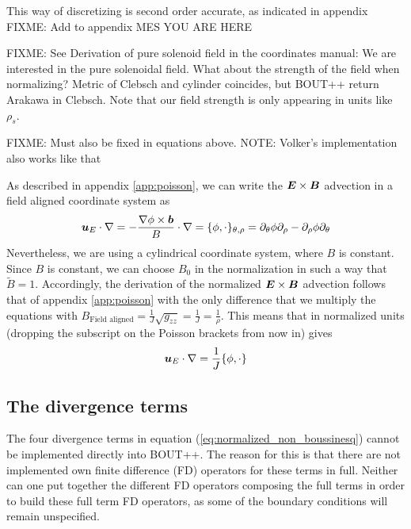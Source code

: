 This way of discretizing is second order accurate, as indicated in appendix
FIXME: Add to appendix MES
YOU ARE HERE










FIXME: See Derivation of pure solenoid field in the coordinates manual: We are
interested in the pure solenoidal field. What about the strength of the field
when normalizing? Metric of Clebsch and cylinder coincides, but BOUT++ return
Arakawa in Clebsch. Note that our field strength is only appearing in units
like $\rho_s$.

FIXME: Must also be fixed in equations above. NOTE: Volker's implementation
also works like that

As described in appendix \ref{app:poisson}, we can write the
$\boldsymbol{E}\times\boldsymbol{B}$ advection in a field aligned coordinate system as
%
\begin{align}
    \boldsymbol{u}_E\cdot\nabla
    = -\frac{\nabla\phi\times\boldsymbol{b}}{B}\cdot\nabla
    = \{\phi, \cdot\}_{\theta,\rho}
    = \partial_\theta\phi\partial_\rho - \partial_\rho\phi\partial_\theta
    \label{eq:non_norm_adv}
\end{align}
%
Nevertheless, we are using a cylindrical coordinate system, where $B$ is
constant.  Since $B$ is constant,
we can choose $B_0$ in the normalization in such a way that $\widetilde{B}=1$.
Accordingly, the derivation of the normalized $\boldsymbol{E}\times \boldsymbol{B}$ advection
follows that of appendix \ref{app:poisson} with the only difference that we
multiply the equations with
$B_\text{Field aligned}=\frac{1}{J}\sqrt{g_{zz}}=\frac{1}{J}=\frac{1}{\rho}$.
This means that in normalized units (dropping the subscript on the Poisson
brackets from now in) gives
%
\begin{align*}
    \boldsymbol{u}_E\cdot\nabla = \frac{1}{J}\{\phi, \cdot\}
\end{align*}


\subsection{The divergence terms}
%
The four divergence terms in equation (\ref{eq:normalized_non_boussinesq})
cannot be implemented directly into BOUT++. The reason for this is that there
are not implemented own finite difference (FD) operators for these terms in
full. Neither can one put together the different FD operators composing the
full terms in order to build these full term FD operators, as some of the
boundary conditions will remain unspecified.

